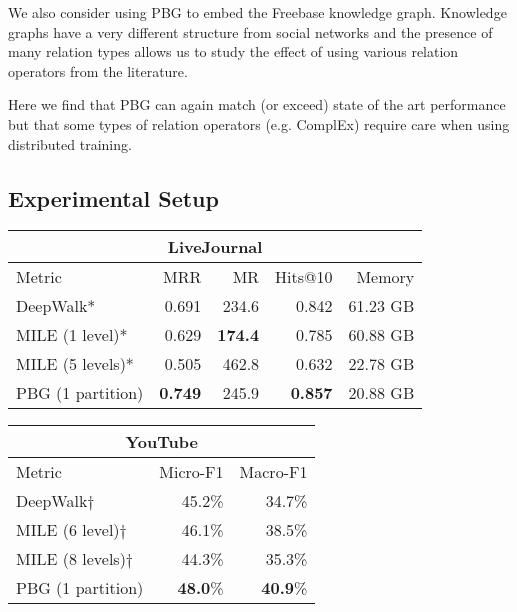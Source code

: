 \documentclass{article}
\begin{document}
We also consider using PBG to embed the Freebase knowledge graph. Knowledge graphs have a very different structure from social networks and the presence of many relation types allows us to study the effect of using various relation operators from the literature.

Here we find that PBG can again match (or exceed) state of the art performance but that some types of relation operators (e.g. ComplEx) require care when using distributed training. 







\subsection{Experimental Setup}

\begin{table*}[t]
\centering
\begin{tabular}{l r r r r}
\hline
\multicolumn{5}{c}{\textbf{LiveJournal}} \\\hline
Metric & MRR & MR & Hits@10	& Memory\\\hline
DeepWalk* & 0.691 & 234.6 & 0.842 & 61.23 GB \\
MILE (1 level)* & 0.629 & \textbf{174.4} & 0.785 & 60.88 GB\\
MILE (5 levels)* & 0.505 & 462.8 & 0.632 & 22.78 GB
\\\hline
PBG (1 partition) & \textbf{0.749} & 245.9 & \textbf{0.857} & 20.88 GB
\\\hline 
\end{tabular}
\quad
\begin{tabular}{l r r}
\hline
\multicolumn{3}{c}{\textbf{YouTube}} \\\hline
Metric & Micro-F1 & Macro-F1 \\\hline
DeepWalk$\dagger$ & 45.2\% & 34.7\% \\
MILE (6 level)$\dagger$ & 46.1\% & 38.5\% \\
MILE (8 levels)$\dagger$ & 44.3\% & 35.3\%
\\\hline
PBG (1 partition) & \textbf{48.0}\% & \textbf{40.9}\% 
\\\hline 
\end{tabular}
\caption{\label{tab:livejournal} Performance of PBG, DeepWalk, and MILE on the LiveJournal dataset and the YouTube dataset. \textbf{Left:} Link prediction evaluation and peak memory usage for the trained embeddings of the LiveJournal dataset and YouTube dataset. The ranking metrics on the test set are obtained by ranking positive edges among randomly sampled corrupted edges. \textbf{Right:} Micro-f1 and Macro-f1 on the user categories prediction task of the YouTube dataset when using learned embeddings as features. \textbf{*} Results obtained running software provided by the original authors. $\dagger$ Results reported in \cite{liang2018mile}.
\label{tab:livejournal-result}
}
\end{table*}
\end{document}
